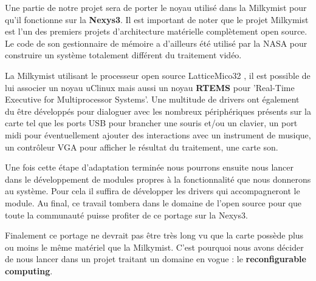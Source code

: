 Une partie de notre projet sera de porter le noyau utilisé dans la Milkymist \cite{MILKY_SITE}
pour qu'il fonctionne sur la {\bf Nexys3}. Il est important de noter que le
projet Milkymist est l'un des premiers projets d'architecture matérielle
complètement open source. Le code de son gestionnaire de mémoire a d'ailleurs
été utilisé par la NASA pour construire un système totalement différent du
traitement vidéo.

La Milkymist utilisant le processeur open source LatticeMico32 \cite{LATTICE}, il est possible
de lui associer un noyau uClinux mais aussi un noyau {\bf RTEMS} pour
'Real-Time Executive for Multiprocessor Systems'. Une multitude de drivers ont
également du être développés pour dialoguer avec les nombreux périphériques
présents sur la carte tel que les ports USB pour brancher une souris et/ou un
clavier, un port midi pour éventuellement ajouter des interactions avec un
instrument de musique, un contrôleur VGA pour afficher le résultat du
traitement, une carte son.

Une fois cette étape d'adaptation terminée nous pourrons ensuite nous lancer
dans le développement de modules propres à la fonctionnalité que nous donnerons
au système. Pour cela il suffira de développer les drivers qui accompagneront
le module. Au final, ce travail tombera dans le domaine de l'open source pour
que toute la communauté puisse profiter de ce portage sur la Nexys3.

Finalement ce portage ne devrait pas être très long vu que la carte possède
plus ou moins le même matériel que la Milkymist. C'est pourquoi nous avons
décider de nous lancer dans un projet traitant un domaine en vogue : le {\bf
reconfigurable computing}.


